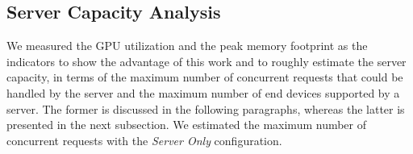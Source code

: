 \documentclass[conference]{IEEEtran}
\begin{document}


\subsection{Server Capacity Analysis}
\label{sec:capacityanalysis}
We measured the GPU utilization and the peak memory footprint as the indicators to show the advantage of this work and to roughly estimate the server capacity, in terms of the maximum number of concurrent requests that could be handled by the server and the maximum number of end devices supported by a server. The former is discussed in the following paragraphs, whereas the latter is presented in the next subsection. We estimated the maximum number of concurrent requests with the \emph{Server Only} configuration.
\end{document}
